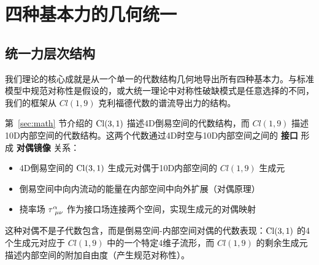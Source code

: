 \section{四种基本力的几何统一}
\label{sec:four_forces_unified}

\subsection{统一力层次结构}

我们理论的核心成就是从一个单一的代数结构几何地导出所有四种基本力。与标准模型中规范对称性是假设的，或大统一理论中对称性破缺模式是任意选择的不同，我们的框架从 $Cl(1,9)$ 克利福德代数的谱流导出力的结构。

\begin{insight}[$Cl(1,9)$ 与 $\Cl(3,1)$ 之间的对偶性]
第~\ref{sec:math} 节介绍的 $\Cl(3,1)$ 描述4D倒易空间的代数结构，而 $Cl(1,9)$ 描述10D内部空间的代数结构。这两个代数通过4D时空与10D内部空间之间的 \textbf{接口} 形成 \textbf{对偶镜像} 关系：
\begin{itemize}
    \item 4D倒易空间的 $\Cl(3,1)$ 生成元对偶于10D内部空间的 $Cl(1,9)$ 生成元
    \item 倒易空间中向内流动的能量在内部空间中向外扩展（对偶原理）
    \item 挠率场 $\torsion^\alpha_{\ \mu\nu}$ 作为接口场连接两个空间，实现生成元的对偶映射
\end{itemize}
这种对偶不是子代数包含，而是倒易空间-内部空间对偶的代数表现：$\Cl(3,1)$ 的4个生成元对应于 $Cl(1,9)$ 中的一个特定4维子流形，而 $Cl(1,9)$ 的剩余生成元描述内部空间的附加自由度（产生规范对称性）。
\end{insight}

